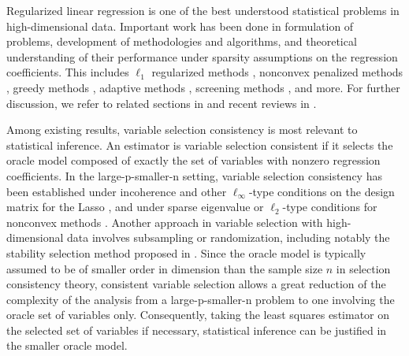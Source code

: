 \documentclass[11pt]{amsart}
\begin{document}
Regularized linear regression is one of the best understood statistical problems in 
high-dimensional data. Important work has been done in formulation of problems, 
development of methodologies and algorithms, and theoretical understanding 
of their performance under sparsity assumptions on the regression coefficients. 
This includes $\ell_1$ regularized methods %
\cite{Tibshirani96, ChenDS01,%
GreenshteinR04,Greenshtein06,MeinshausenB06,Tropp06,ZhaoY06,
CandesT07,%
ZhangH08,BickelRT09,Koltchinskii09,MeinshausenY09,vandeGeerB09,Wainwright09,Zhang09-l1,%
YeZ10,KoltchinskiiLT11,SunZ11}, 
nonconvex penalized methods 
\cite{FrankF93,FanL01,FanP04,%
KiChOh08,Zhang10-mc+,
ZhangZ11}, 
greedy methods \cite{%
Zhang11-foba}, 
adaptive methods \cite{Zou06,HuangMZ08,ZouL08,%
Zhang11-multistage,ZhangZ11}, 
screening methods \cite{FanL08}, and more. For further discussion, we refer to related sections in 
\cite{BuhlmannGeer11} and recent reviews in \cite{FanL10,ZhangZ11}. 

Among existing results, variable selection consistency is most relevant to statistical inference. 
An estimator is variable selection consistent if it selects the oracle model composed of 
exactly the set of variables with nonzero 
regression coefficients. In the large-p-smaller-n setting, 
variable selection consistency has been established under incoherence and other 
$\ell_\infty$-type conditions on the design matrix for the Lasso 
\cite{MeinshausenB06,Tropp06,ZhaoY06,Wainwright09}, 
and under sparse eigenvalue or $\ell_2$-type conditions for nonconvex methods 
\cite{FanP04,Zhang10-mc+,Zhang11-foba,Zhang11-multistage,ZhangZ11}. 
Another approach in variable selection with high-dimensional data involves subsampling or randomization,  
including notably the stability selection method proposed in \cite{MeinshausenB10}. 
Since the oracle model is typically %
assumed to be of smaller order 
in dimension than the sample size $n$ in selection consistency theory, consistent variable selection 
allows a great reduction of the complexity of the analysis from a large-p-smaller-n problem 
to one involving the oracle set of variables only. 
Consequently, taking the least squares estimator on the selected set of variables if necessary, statistical inference can be justified in the smaller oracle model.  
\end{document}
